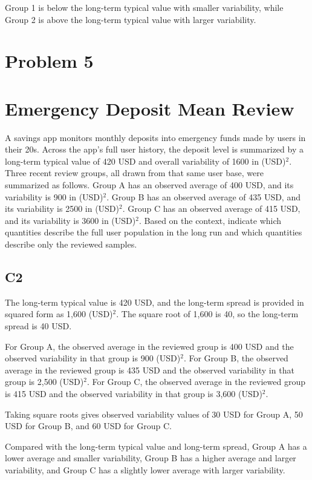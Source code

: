 \begin{ExamProblems}
		Group 1 is below the long-term typical value with smaller variability, while Group 2 is above the long-term typical value with larger variability.


		\newpage
		\item
		\section{Problem 5}
		\section{Emergency Deposit Mean Review}
		A savings app monitors monthly deposits into emergency funds made by users in their 20s.
		Across the app's full user history, the deposit level is summarized by a long-term typical value of 420 USD and overall variability of 1600 in (USD)$^2$.
		Three recent review groups, all drawn from that same user base, were summarized as follows.
		Group A has an observed average of 400 USD, and its variability is 900 in (USD)$^2$.
		Group B has an observed average of 435 USD, and its variability is 2500 in (USD)$^2$.
		Group C has an observed average of 415 USD, and its variability is 3600 in (USD)$^2$.
		Based on the context, indicate which quantities describe the full user population in the long run and which quantities describe only the reviewed samples.

\subsection*{C2}
		The long-term typical value is 420 USD, and the long-term spread is provided in squared form as 1,600 (USD)$^2$.
		The square root of 1,600 is 40, so the long-term spread is 40 USD.

		For Group A, the observed average in the reviewed group is 400 USD and the observed variability in that group is 900 (USD)$^2$.
		For Group B, the observed average in the reviewed group is 435 USD and the observed variability in that group is 2,500 (USD)$^2$.
		For Group C, the observed average in the reviewed group is 415 USD and the observed variability in that group is 3,600 (USD)$^2$.

		Taking square roots gives observed variability values of 30 USD for Group A, 50 USD for Group B, and 60 USD for Group C.

		Compared with the long-term typical value and long-term spread, Group A has a lower average and smaller variability, Group B has a higher average and larger variability, and Group C has a slightly lower average with larger variability.



\end{ExamProblems}
